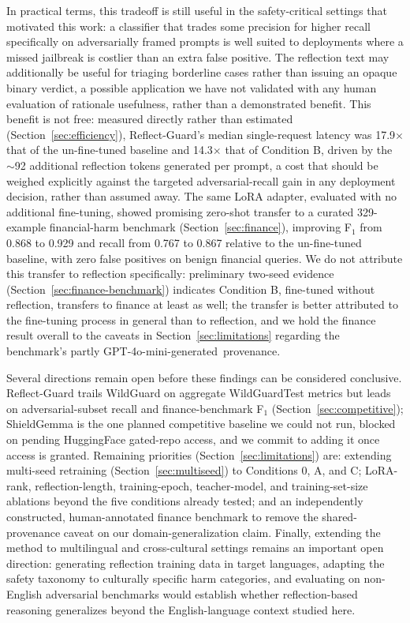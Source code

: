 \documentclass[superintelligence,article,accept,moreauthors]{Definitions/mdpi}
\begin{document}
In practical terms, this tradeoff is still useful in the safety-critical settings that motivated this work: a classifier that trades some precision for higher recall specifically on adversarially framed prompts is well suited to deployments where a missed jailbreak is costlier than an extra false positive. The reflection text may additionally be useful for triaging borderline cases rather than issuing an opaque binary verdict, a possible application we have not validated with any human evaluation of rationale usefulness, rather than a demonstrated benefit. This benefit is not free: measured directly rather than estimated (Section~\ref{sec:efficiency}), Reflect-Guard's median single-request latency was 17.9$\times$ that of the un-fine-tuned baseline and 14.3$\times$ that of Condition B, driven by the $\sim$92 additional reflection tokens generated per prompt, a cost that should be weighed explicitly against the targeted adversarial-recall gain in any deployment decision, rather than assumed away. The same LoRA adapter, evaluated with no additional fine-tuning, showed promising zero-shot transfer to a curated 329-example financial-harm benchmark (Section~\ref{sec:finance}), improving F$_1$ from 0.868 to 0.929 and recall from 0.767 to 0.867 relative to the un-fine-tuned baseline, with zero false positives on benign financial queries. %
 We do not attribute this transfer to reflection specifically: preliminary two-seed evidence (Section~\ref{sec:finance-benchmark}) indicates Condition B, fine-tuned without reflection, transfers to finance at least as well; the transfer is better attributed to the fine-tuning process in general than to reflection, and we hold the finance result overall to the caveats in Section~\ref{sec:limitations} regarding the benchmark's partly GPT-4o-mini-\mbox{generated provenance.}

Several directions remain open before these findings can be considered conclusive. Reflect-Guard trails WildGuard on aggregate WildGuardTest metrics but leads on adversarial-subset recall and finance-benchmark F$_1$ (Section~\ref{sec:competitive}); ShieldGemma is the one planned competitive baseline we could not run, blocked on pending HuggingFace gated-repo access, and we commit to adding it once access is granted. Remaining priorities (Section~\ref{sec:limitations}) are: extending multi-seed retraining (Section~\ref{sec:multiseed}) to Conditions 0, A, and C; LoRA-rank, reflection-length, training-epoch, teacher-model, and training-set-size ablations beyond the five conditions already tested; and an independently constructed, human-annotated finance benchmark to remove the shared-provenance caveat on our domain-generalization claim. Finally, extending the method to multilingual and cross-cultural settings remains an important open direction: generating reflection training data in target languages, adapting the safety taxonomy to culturally specific harm categories, and evaluating on non-English adversarial benchmarks would establish whether reflection-based reasoning generalizes beyond the English-language context studied here.
\end{document}
